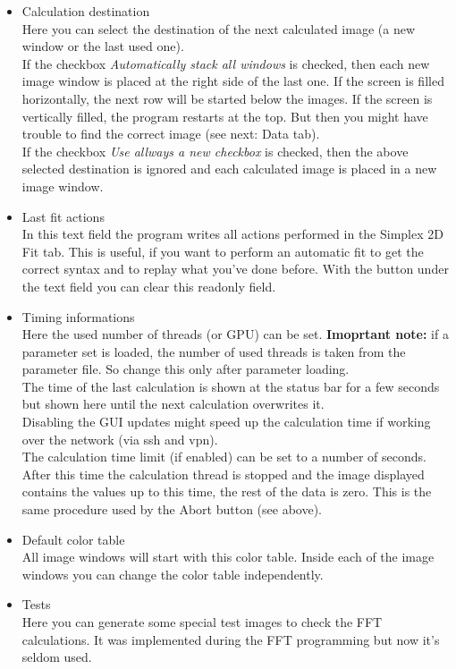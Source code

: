 \documentclass[11pt]{article} %
\begin{document}
\begin{itemize}\itemsep0pt
\item Calculation destination \\
	Here you can select the destination of the next calculated image (a new window or the last used one). \\
	If the checkbox {\it Automatically stack all windows} is checked, then each new image window is placed at the right side of the last one. If the screen is filled horizontally, the next row will be started below the images. If the screen is vertically filled, the program restarts at the top. But then you might have trouble to find the correct image (see next: Data tab). \\
	If the checkbox {\it Use allways a new checkbox} is checked, then the above selected destination is ignored and each calculated image is placed in a new image window.
\item Last fit actions \\
	In this text field the program writes all actions performed in the Simplex 2D Fit tab. This is useful, if you want to perform an automatic fit to get the correct syntax and to replay what you've done before. With the button under the text field you can clear this readonly field.
\item Timing informations \\
	Here the used number of threads (or GPU) can be set. {\bf Imoprtant note:} if a parameter set is loaded, the number of used threads is taken from the parameter file. So change this only after parameter loading. \\
	The time of the last calculation is shown at the status bar for a few seconds but shown here until the next calculation overwrites it. \\
	Disabling the GUI updates might speed up the calculation time if working over the network (via ssh and vpn). \\
	The calculation time limit (if enabled) can be set to a number of seconds. After this time the calculation thread is stopped and the image displayed contains the values up to this time, the rest of the data is zero. This is the same procedure used by the Abort button (see above).
\item Default color table \\
	All image windows will start with this color table. Inside each of the image windows you can change the color table independently.
\item Tests \\
	Here you can generate some special test images to check the FFT calculations. It was implemented during the FFT programming but now it's seldom used.
\end{itemize}
\end{document}
